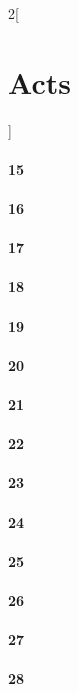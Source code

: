 \documentclass{book}
\begin{document}
\begin{multicols}{2}[\part{Acts}]
\subsection*{15}
\subsection*{16}
\subsection*{17}
\subsection*{18}
\subsection*{19}
\subsection*{20}
\subsection*{21}
\subsection*{22}
\subsection*{23}
\subsection*{24}
\subsection*{25}
\subsection*{26}
\subsection*{27}
\subsection*{28}
\end{multicols}
\end{document}
